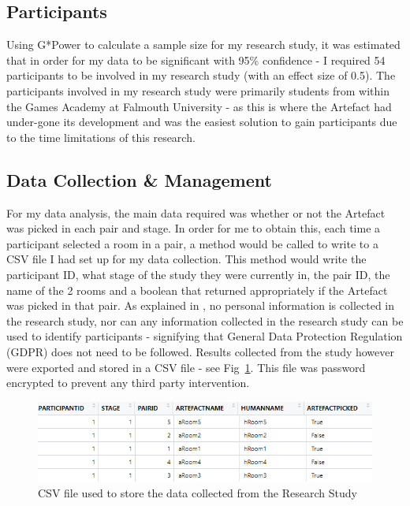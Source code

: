 \subsection{Participants}
Using G*Power to calculate a sample size for my research study, it was estimated that in order for my data to be significant with 95\% confidence - I required 54 participants to be involved in my research study (with an effect size of 0.5).
The participants involved in my research study were primarily students from within the Games Academy at Falmouth University - as this is where the Artefact had under-gone its development and was the easiest solution to gain participants due to the time limitations of this research.

\subsection{Data Collection \& Management}
For my data analysis, the main data required was whether or not the Artefact was picked in each pair and stage. In order for me to obtain this, each time a participant selected a room in a pair, a method would be called to write to a CSV file I had set up for my data collection. This method would write the participant ID, what stage of the study they were currently in, the pair ID, the name of the 2 rooms and a boolean that returned appropriately if the Artefact was picked in that pair.
As explained in \hyperref[ethics]{}, no personal information is collected in the research study, nor can any information collected in the research study can be used to identify participants - signifying that General Data Protection Regulation (GDPR) \cite{gdpr} does not need to be followed. Results collected from the study however were exported and stored in a CSV file - see Fig~\ref{csv-file}. This file was password encrypted to prevent any third party intervention.

\begin{figure}[ht]
    \includegraphics[width=\columnwidth]{./Images/csv-image.png}
    \centering
    \caption{CSV file used to store the data collected from the Research Study}
    \label{csv-file}
\end{figure}


